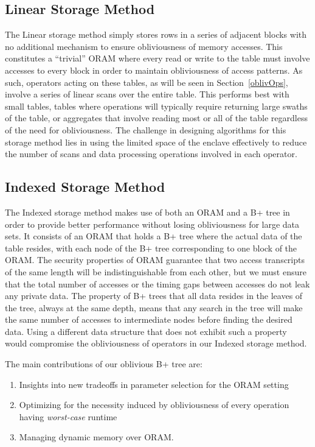\documentclass[letterpaper,twocolumn,10pt]{article}
\begin{document}
\subsection{Linear Storage Method}
The Linear storage method simply stores rows in a series of adjacent blocks with no additional mechanism to ensure obliviousness of memory accesses. This constitutes a ``trivial'' ORAM where every read or write to the table must involve accesses to every block in order to maintain obliviousness of access patterns. As such, operators acting on these tables, as will be seen in Section~\ref{oblivOps}, involve a series of linear scans over the entire table. This performs best with small tables, tables where operations will typically require returning large swaths of the table, or aggregates that involve reading most or all of the table regardless of the need for obliviousness. The challenge in designing algorithms for this storage method lies in using the limited space of the enclave effectively to reduce the number of scans and data processing operations involved in each operator.

\subsection{Indexed Storage Method}
The Indexed storage method makes use of both an ORAM and a B+ tree in order to provide better performance without losing obliviousness for large data sets. It consists of an ORAM that holds a B+ tree where the actual data of the table resides, with each node of the B+ tree corresponding to one block of the ORAM. The security properties of ORAM guarantee that two access transcripts of the same length will be indistinguishable from each other, but we must ensure that the total number of accesses or the timing gaps between accesses do not leak any private data. The property of B+ trees that all data resides in the leaves of the tree, always at the same depth, means that any search in the tree will make the same number of accesses to intermediate nodes before finding the desired data. Using a different data structure that does not exhibit such a property would compromise the obliviousness of operators in our Indexed storage method.

The main contributions of our oblivious B+ tree are:
\begin{enumerate}
\setlength\itemsep{0pt}
\item Insights into new tradeoffs in parameter selection for the ORAM setting
\item Optimizing for the necessity induced by obliviousness of every operation having \emph{worst-case} runtime
\item Managing dynamic memory over ORAM.
\end{enumerate}
\end{document}

